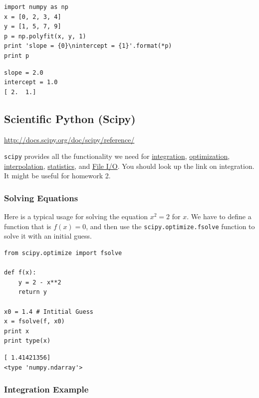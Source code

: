 \documentclass[11pt]{article}
\begin{document}
\begin{verbatim}
import numpy as np
x = [0, 2, 3, 4]
y = [1, 5, 7, 9]
p = np.polyfit(x, y, 1)
print 'slope = {0}\nintercept = {1}'.format(*p)
print p
\end{verbatim}

\begin{verbatim}
slope = 2.0
intercept = 1.0
[ 2.  1.]
\end{verbatim}


\subsection{Scientific Python (Scipy)}
\label{sec-3-12}
\url{http://docs.scipy.org/doc/scipy/reference/}

\texttt{scipy} provides all the functionality we need for \href{http://docs.scipy.org/doc/scipy/reference/tutorial/integrate.html}{integration}, \href{http://docs.scipy.org/doc/scipy/reference/tutorial/optimize.html}{optimization}, \href{http://docs.scipy.org/doc/scipy/reference/tutorial/interpolate.html}{interpolation}, \href{http://docs.scipy.org/doc/scipy/reference/tutorial/stats.html}{statistics}, and \href{http://docs.scipy.org/doc/scipy/reference/tutorial/io.html}{File I/O}. You should look up the link on integration. It might be useful for homework 2.


\subsubsection{Solving Equations}
\label{sec-3-12-1}
Here is a typical usage for solving the equation $x^2 = 2$ for $x$. We have to define a function that is $f(x) = 0$, and then use the \texttt{scipy.optimize.fsolve} function to solve it with an initial guess.

\begin{verbatim}
from scipy.optimize import fsolve

def f(x):
    y = 2 - x**2
    return y

x0 = 1.4 # Intitial Guess
x = fsolve(f, x0)
print x
print type(x)
\end{verbatim}

\begin{verbatim}
[ 1.41421356]
<type 'numpy.ndarray'>
\end{verbatim}



\subsubsection{Integration Example}
\label{sec-3-12-2}
\end{document}
